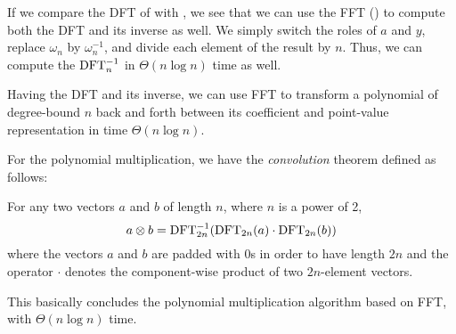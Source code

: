 If we compare the DFT of  with , we
see that we can use the FFT () to compute both the DFT and
its inverse as well. We simply switch the roles of $a$ and $y$, replace
$\omega_n$ by $\omega_n^{-1}$, and divide each element of the result by $n$.
Thus, we can compute the $\operatorname{DFT}_n^{-1}$ in $\Theta(n \log{n})$ time as well.

Having the DFT and its inverse, we can use FFT to transform a polynomial of
degree-bound $n$ back and forth between its coefficient and point-value
representation in time $\Theta(n \log{n})$.

For the polynomial multiplication, we have the \emph{convolution} theorem
defined as follows:
\begin{theorem}
  For any two vectors $a$ and $b$ of length $n$, where $n$ is a power of 2,
  \begin{equation*}
    a \otimes b = \operatorname{DFT}_{2n}^{-1}(\operatorname{DFT}_{2n}(a) \cdot \operatorname{DFT}_{2n}(b))
  \end{equation*}
  where the vectors $a$ and $b$ are padded with $0$s in order to have length
  $2n$ and the operator $\cdot$ denotes the component-wise product of two
  $2n$-element vectors.
  \label{eq:convolution}
\end{theorem}

This basically concludes the polynomial multiplication algorithm based on FFT,
with $\Theta(n \log{n})$ time.
